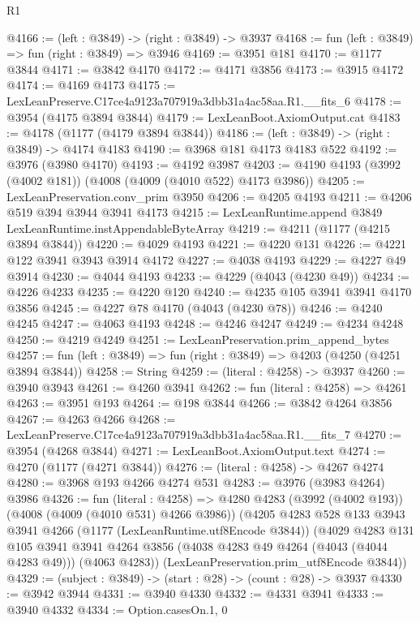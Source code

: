 \begin{lexlean}{R1}
\begin{coremodule}
@4166 := (left : @3849) -> (right : @3849) -> @3937
@4168 := fun (left : @3849) => fun (right : @3849) => @3946
@4169 := @3951 @181
@4170 := @1177 @3844
@4171 := @3842 @4170
@4172 := @4171 @3856
@4173 := @3915 @4172
@4174 := @4169 @4173
@4175 := LexLeanPreserve.C17ce4a9123a707919a3dbb31a4ac58aa.R1.__fits_6
@4178 := @3954 (@4175 @3894 @3844)
@4179 := LexLeanBoot.AxiomOutput.cat
@4183 := @4178 (@1177 (@4179 @3894 @3844))
@4186 := (left : @3849) -> (right : @3849) -> @4174 @4183
@4190 := @3968 @181 @4173 @4183 @522
@4192 := @3976 (@3980 @4170)
@4193 := @4192 @3987
@4203 := @4190 @4193 (@3992 (@4002 @181)) (@4008 (@4009 (@4010 @522) @4173 @3986))
@4205 := LexLeanPreservation.conv_prim @3950
@4206 := @4205 @4193
@4211 := @4206 @519 @394 @3944 @3941 @4173
@4215 := LexLeanRuntime.append @3849 LexLeanRuntime.instAppendableByteArray
@4219 := @4211 (@1177 (@4215 @3894 @3844))
@4220 := @4029 @4193
@4221 := @4220 @131
@4226 := @4221 @122 @3941 @3943 @3914 @4172
@4227 := @4038 @4193
@4229 := @4227 @49 @3914
@4230 := @4044 @4193
@4233 := @4229 (@4043 (@4230 @49))
@4234 := @4226 @4233
@4235 := @4220 @120
@4240 := @4235 @105 @3941 @3941 @4170 @3856
@4245 := @4227 @78 @4170 (@4043 (@4230 @78))
@4246 := @4240 @4245
@4247 := @4063 @4193
@4248 := @4246 @4247
@4249 := @4234 @4248
@4250 := @4219 @4249
@4251 := LexLeanPreservation.prim_append_bytes
@4257 := fun (left : @3849) => fun (right : @3849) => @4203 (@4250 (@4251 @3894 @3844))
@4258 := String
@4259 := (literal : @4258) -> @3937
@4260 := @3940 @3943
@4261 := @4260 @3941
@4262 := fun (literal : @4258) => @4261
@4263 := @3951 @193
@4264 := @198 @3844
@4266 := @3842 @4264 @3856
@4267 := @4263 @4266
@4268 := LexLeanPreserve.C17ce4a9123a707919a3dbb31a4ac58aa.R1.__fits_7
@4270 := @3954 (@4268 @3844)
@4271 := LexLeanBoot.AxiomOutput.text
@4274 := @4270 (@1177 (@4271 @3844))
@4276 := (literal : @4258) -> @4267 @4274
@4280 := @3968 @193 @4266 @4274 @531
@4283 := @3976 (@3983 @4264) @3986
@4326 := fun (literal : @4258) =>
  @4280
    @4283
    (@3992 (@4002 @193))
    (@4008 (@4009 (@4010 @531) @4266 @3986))
    (@4205
      @4283
      @528
      @133
      @3943
      @3941
      @4266
      (@1177 (LexLeanRuntime.utf8Encode @3844))
      (@4029
        @4283
        @131
        @105
        @3941
        @3941
        @4264
        @3856
        (@4038 @4283 @49 @4264 (@4043 (@4044 @4283 @49)))
        (@4063 @4283))
      (LexLeanPreservation.prim_utf8Encode @3844))
@4329 := (subject : @3849) -> (start : @28) -> (count : @28) -> @3937
@4330 := @3942 @3944
@4331 := @3940 @4330
@4332 := @4331 @3941
@4333 := @3940 @4332
@4334 := Option.casesOn.{1, 0}

\end{coremodule}
\end{lexlean}
